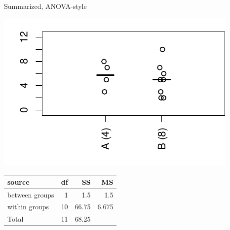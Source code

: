 \begin{frame}{Summarized, ANOVA-style}

  \begin{center}
    \includegraphics{dots3ex.pdf}

    \vspace{2em}

    \begin{tabular}{lrrr}
      source & df & SS & MS \\
      \hline
      between groups & 1 & 1.5 & 1.5 \\
      within groups & 10 & 66.75 & 6.675 \\
      \hline
      Total & 11 & 68.25 & \\
    \end{tabular}

  \end{center}

\end{frame}

